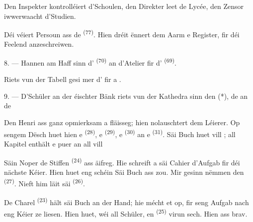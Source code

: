 Den Inspekter kontrolléiert d'Schoulen, den Direkter leet de Lycée, den Zensor
iwwerwaacht d'Studien.

Déi véiert Persoun ass de  \textsuperscript{(77)}. Hien dréit ënnert
dem Aarm e Register, fir déi Feelend anzeschreiwen.

8. --- Hannen am Haff sinn d' \textsuperscript{(70)} an d'Atelier
fir d' \textsuperscript{(69)}.

Riets vun der Tabell gesi mer d' fir  a
.


\VUsaut{2.4mm}

\VUsaut{3.0mm}

9. --- D'Schüler an der éischter Bänk riets vun der Kathedra sinn den 
(*), de  an de 

Den Henri ass ganz opmierksam a fläisseg; hien nolauschtert dem Léierer. Op sengem
Dësch huet hien e  \textsuperscript{(28)}, e 
\textsuperscript{(29)}, e  \textsuperscript{(30)} an e
 \textsuperscript{(31)}. Säi Buch huet vill ; all
Kapitel enthält e puer  an all  vill

Säin Noper de Stiffen \textsuperscript{(24)} ass äifreg. Hie schreift a säi Cahier
d'Aufgab fir déi nächste Kéier. Hien huet eng schéin  Säi Buch ass
zou. Mir gesinn nëmmen den  \textsuperscript{(27)}. Nieft him läit säi
 \textsuperscript{(26)}.

De Charel \textsuperscript{(23)} hält säi Buch an der Hand; hie mécht et op, fir seng
Aufgab nach eng Kéier ze liesen. Hien huet, wéi all Schüler, en
 \textsuperscript{(25)} virun sech. Hien ass brav.

